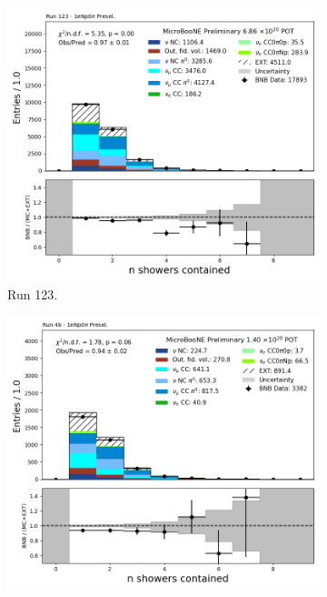 \begin{figure}[H]
    \centering
    \begin{subfigure}[t]{0.32\linewidth}
        \includegraphics[width=\linewidth]{technote/Appendix_Preselection/Figures/1eNp0pi/Run123/n_showers_contained_Run123_1eNp0pi_Presel.png}
        \caption{Run 123.}
    \end{subfigure}%
    \hspace{0.2cm}%
    \begin{subfigure}[t]{0.32\linewidth}
        \includegraphics[width=\linewidth]{technote/Appendix_Preselection/Figures/1eNp0pi/Run4b/n_showers_contained_Run4b_1eNp0pi_Presel.png}

\end{subfigure}
\end{figure}
